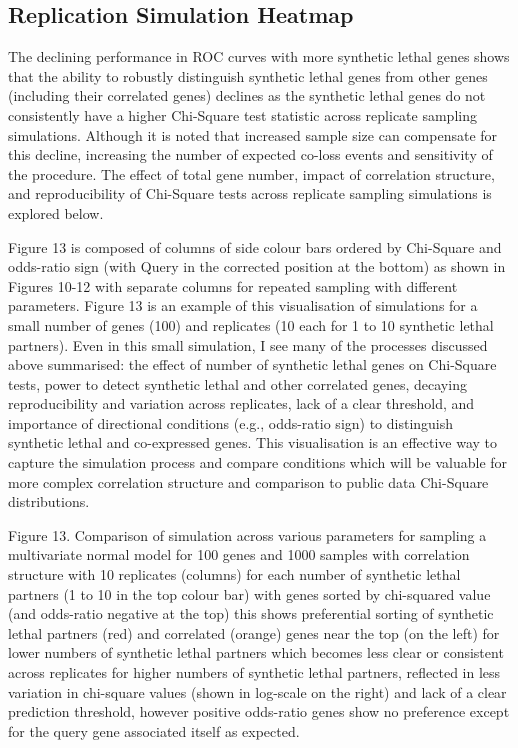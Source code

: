 \subsection{Replication Simulation Heatmap}

The declining performance in \gls{ROC} curves with more \gls{synthetic lethal} genes shows that the ability to robustly distinguish \gls{synthetic lethal} genes from other genes (including their correlated genes) declines as the \gls{synthetic lethal} genes do not consistently have a higher Chi-Square test statistic across replicate sampling simulations.  Although it is noted that increased sample size can compensate for this decline, increasing the number of expected co-loss events and sensitivity of the procedure.  The effect of total gene number, impact of correlation structure, and reproducibility of Chi-Square tests across replicate sampling simulations is explored below.

Figure 13 is composed of columns of side colour bars ordered by Chi-Square and odds-ratio sign (with Query in the corrected position at the bottom) as shown in Figures 10-12 with separate columns for repeated sampling with different parameters.  Figure 13 is an example of this visualisation of simulations for a small number of genes (100) and replicates (10 each for 1 to 10 \gls{synthetic lethal} partners).  Even in this small simulation, I see many of the processes discussed above summarised: the effect of number of \gls{synthetic lethal} genes on Chi-Square tests, power to detect \gls{synthetic lethal} and other correlated genes, decaying reproducibility and variation across replicates, lack of a clear threshold, and importance of directional conditions (e.g., odds-ratio sign) to distinguish \gls{synthetic lethal} and co-expressed genes.  This visualisation is an effective way to capture the simulation process and compare conditions which will be valuable for more complex correlation structure and comparison to public data Chi-Square distributions.
    
Figure 13.  Comparison of simulation across various parameters for sampling a multivariate normal model for 100 genes and 1000 samples with correlation structure with 10 replicates (columns) for each number of \gls{synthetic lethal} partners (1 to 10 in the top colour bar) with genes sorted by chi-squared value (and odds-ratio negative at the top) this shows preferential sorting of \gls{synthetic lethal} partners (red) and correlated (orange) genes near the top (on the left) for lower numbers of \gls{synthetic lethal} partners which becomes less clear or consistent across replicates for higher numbers of \gls{synthetic lethal} partners, reflected in less variation in chi-square values (shown in log-scale on the right) and lack of a clear prediction threshold, however positive odds-ratio genes show no preference except for the query gene associated itself as expected.

